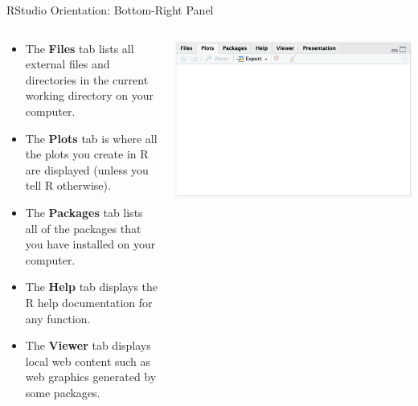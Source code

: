 \documentclass[aspectratio=169,xcolor=dvipsnames]{beamer}
\begin{document}
\begin{frame}{RStudio Orientation: Bottom-Right Panel}
\begin{columns}
        \begin{column}{0.5\textwidth}
	\begin{itemize}
	\item  The \textbf{Files} tab lists all external files and directories in the current working directory on your computer.
	\item The \textbf{Plots} tab is where all the plots you create in R are displayed (unless you tell R otherwise).
	\item The \textbf{Packages} tab lists all of the packages that you have installed on your computer.
	\item The \textbf{Help} tab displays the R help documentation for any function.
	\item The \textbf{Viewer} tab displays local web content such as web graphics generated by some packages.
	\end{itemize}
        \end{column}

        \begin{column}{0.5\textwidth}
            \centering
            \includegraphics[scale=0.32]{images/files.png}
        \end{column}
    \end{columns}
\end{frame}
\end{document}
